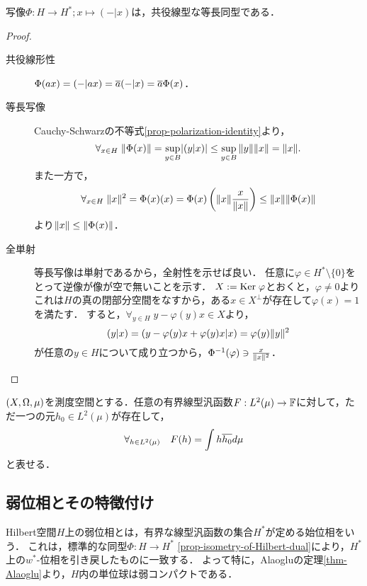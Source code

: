 \documentclass[uplatex,dvipdfmx]{jsreport}
\begin{document}
\begin{proposition}\label{prop-isometry-of-Hilbert-dual}
    写像$\Phi:H\to H^*;x\mapsto(-|x)$は，共役線型な等長同型である．
\end{proposition}
\begin{proof}\mbox{}
    \begin{description}
        \item[共役線形性] $\Phi(ax)=(-|ax)=\overline{a}(-|x)=\overline{a}\Phi(x)$．
        \item[等長写像] Cauchy-Schwarzの不等式\ref{prop-polarization-identity}より，
        \[\forall_{x\in H}\;\|\Phi(x)\|=\sup_{y\in B}\lvert(y|x)\rvert\le\sup_{y\in B}\|y\|\|x\|=\|x\|.\]
        また一方で，
        \[\forall_{x\in H}\;\|x\|^2=\Phi(x)(x)=\Phi(x)\left(\|x\|\frac{x}{\|x\|}\right)\le\|x\|\|\Phi(x)\|\]
        より$\|x\|\le\|\Phi(x)\|$．
        \item[全単射] 等長写像は単射であるから，全射性を示せば良い．
        任意に$\varphi\in H^*\setminus\{0\}$をとって逆像が像が空で無いことを示す．
        $X:=\mathrm{Ker}\;\varphi$とおくと，$\varphi\ne 0$よりこれは$H$の真の閉部分空間をなすから，ある$x\in X^\perp$が存在して$\varphi(x)=1$を満たす．
        すると，$\forall_{y\in H}\;y-\varphi(y)x\in X$より，
        \[(y|x)=(y-\varphi(y)x+\varphi(y)x|x)=\varphi(y)\|y\|^2\]
        が任意の$y\in H$について成り立つから，$\Phi^{-1}(\varphi)\ni\frac{x}{\|x\|^2}$．
    \end{description}
\end{proof}

\begin{corollary}[$L^2$上の有界線形関数の積分表現]
    $(X,\Omega,\mu)$を測度空間とする．任意の有界線型汎函数$F:L^2(\mu)\to\mathbb{F}$に対して，ただ一つの元$h_0\in L^2(\mu)$が存在して，
    \[\forall_{h\in L^2(\mu)}\quad F(h)=\int h\overline{h_0}d\mu\]
    と表せる．
\end{corollary}

\subsection{弱位相とその特徴付け}

\begin{definition}\label{def-weak-topology-on-H(B)}
    Hilbert空間$H$上の弱位相とは，有界な線型汎函数の集合$H^*$が定める始位相をいう．
    これは，標準的な同型$\Phi:H\to H^*$ \ref{prop-isometry-of-Hilbert-dual}により，$H^*$上の$w^*$-位相を引き戻したものに一致する．
    よって特に，Alaogluの定理\ref{thm-Alaoglu}より，$H$内の単位球は弱コンパクトである．
\end{definition}
\end{document}

